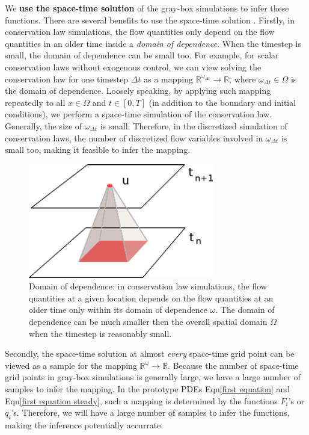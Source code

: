 \documentclass[a4paper,onecolumn]{article}
\theoremstyle{remark}
\begin{document}
\noindent We \textbf{use the space-time solution} of the gray-box simulations 
to infer these functions.
There are several benefits to use the space-time solution \cite{hanmaster}.
Firstly, in conservation law simulations, the flow quantities only depend on the flow
quantities in an older time inside a \emph{domain of dependence}.
When the timestep is small,
the domain of dependence can be small too. For example, for scalar conservation laws 
without exogenous control,
we can view solving the conservation law for one timestep $\Delta t$ as a mapping 
$\mathbb{R}^{\omega_{\Delta t}} \rightarrow \mathbb{R}$, where $\omega_{\Delta t}\in \Omega$ 
is the domain of dependence. 
Loosely speaking, by applying such mapping repeatedly to all $x\in \Omega$ and $t\in[0,T]$
(in addition to the boundary and initial conditions), we perform 
a space-time simulation of the conservation law. 
Generally, the size of $\omega_{\Delta t}$ is small.
Therefore, in the discretized simulation of conservation laws,
the number of discretized flow variables involved in $\omega_{\Delta t}$ is small too,
making it feasible to infer the mapping.
\\

\begin{figure}[H]\begin{center}
    \includegraphics[height=5cm]{locality.png}
    \caption{Domain of dependence: in conservation law simulations,
             the flow quantities at a given location
             depends on the flow quantities at an older time only within its
             domain of dependence $\omega$. The domain of dependence can be much smaller
             then the overall spatial domain $\Omega$ when the timestep is reasonably small.}
    \label{locality}
\end{center}\end{figure}

\noindent Secondly, the space-time solution at almost \emph{every} space-time grid point can be viewed
as a sample for the mapping $\mathbb{R}^\omega \rightarrow \mathbb{R}$. 
Because the number of space-time grid points in gray-box simulations is generally large,
we have a large number of samples to infer the mapping. 
In the prototype PDEs Eqn\eqref{first equation} and Eqn\eqref{first equation steady},
such a mapping is determined by the functions $F_i$'s or $q_i$'s.
Therefore, we will have a large number of samples to infer the functions,
making the inference potentially accurrate.\\
\end{document}
